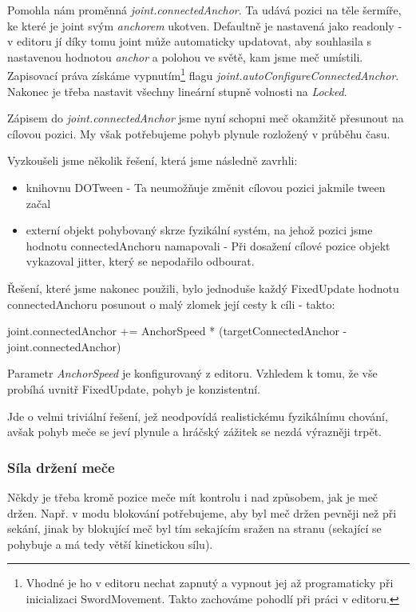 Pomohla nám proměnná \textit{joint.connectedAnchor}. Ta udává pozici na těle šermíře, ke které je joint svým \textit{anchorem} ukotven. Defaultně je nastavená jako readonly - v editoru jí díky tomu joint může automaticky updatovat, aby souhlasila s nastavenou hodnotou \textit{anchor} a polohou ve světě, kam jsme meč umístili. Zapisovací práva získáme vypnutím\footnote{Vhodné je ho v editoru nechat zapnutý a vypnout jej až programaticky při inicializaci SwordMovement. Takto zachováme pohodlí při práci v editoru.} flagu \textit{joint.autoConfigureConnectedAnchor}. Nakonec je třeba nastavit všechny lineární stupně volnosti na \textit{Locked}.

Zápisem do \textit{joint.connectedAnchor} jsme nyní schopni meč okamžitě přesunout na cílovou pozici. My však potřebujeme pohyb plynule rozložený v průběhu času. 

Vyzkoušeli jsme několik řešení, která jsme následně zavrhli:
\begin{itemize}
  \item knihovnu DOTween - Ta neumožňuje změnit cílovou pozici jakmile tween začal
  \item externí objekt pohybovaný skrze fyzikální systém, na jehož pozici jsme hodnotu connectedAnchoru namapovali - Při dosažení cílové pozice objekt vykazoval jitter, který se nepodařilo odbourat.
\end{itemize}
Řešení, které jsme nakonec použili, bylo jednoduše každý FixedUpdate hodnotu connectedAnchoru posunout o malý zlomek její cesty k cíli - takto: 
\begin{code}
 joint.connectedAnchor += AnchorSpeed *
   (targetConnectedAnchor - joint.connectedAnchor) 
\end{code}
Parametr \textit{AnchorSpeed} je konfigurovaný z editoru. Vzhledem k tomu, že vše probíhá uvnitř FixedUpdate, pohyb je konzistentní.

Jde o velmi triviální řešení, jež neodpovídá realistickému fyzikálnímu chování, avšak pohyb meče se jeví plynule a hráčský zážitek se nezdá výrazněji trpět.

\subsubsection*{Síla držení meče} \label{implementationSwordHoldingForceSubsubsection}

Někdy je třeba kromě pozice meče mít kontrolu i nad způsobem, jak je meč držen. Např. v modu blokování potřebujeme, aby byl meč držen pevněji než při sekání, jinak by blokující meč byl tím sekajícím sražen na stranu (sekající se pohybuje a má tedy větší kinetickou sílu). 

